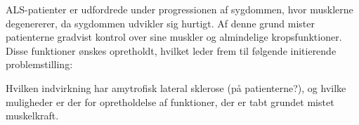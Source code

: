 ALS-patienter er udfordrede under progressionen af sygdommen, hvor musklerne degenererer, da sygdommen udvikler sig hurtigt. Af denne grund mister patienterne gradvist kontrol over sine muskler og almindelige kropsfunktioner. Disse funktioner ønskes opretholdt, hvilket leder frem til følgende initierende problemstilling:

Hvilken indvirkning har amytrofisk lateral sklerose (på patienterne?), og hvilke muligheder er der for opretholdelse af funktioner, der er tabt grundet mistet muskelkraft. 
 
